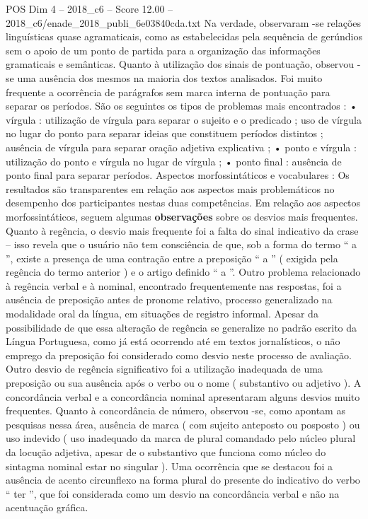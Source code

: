 \begin{textsample}{POS Dim 4 – 2018\_c6 – Score 12.00 – 2018\_c6/enade\_2018\_publi\_6e03840cda.txt}
Na verdade, observaram -se relações linguísticas quase agramaticais, como as estabelecidas pela sequência de gerúndios sem o apoio de um ponto de partida para a organização das informações gramaticais e semânticas.
Quanto à utilização dos sinais de pontuação, observou -se uma ausência dos mesmos na maioria dos textos analisados.
Foi muito frequente a ocorrência de parágrafos sem marca interna de pontuação para separar os períodos.
São os seguintes os tipos de problemas mais encontrados : • vírgula : utilização de vírgula para separar o sujeito e o predicado ; uso de vírgula no lugar do ponto para separar ideias que constituem períodos distintos ; ausência de vírgula para separar oração adjetiva explicativa ; • ponto e vírgula : utilização do ponto e vírgula no lugar de vírgula ; • ponto final : ausência de ponto final para separar períodos.
Aspectos morfossintáticos e vocabulares : Os resultados são transparentes em relação aos aspectos mais problemáticos no desempenho dos participantes nestas duas competências.
Em relação aos aspectos morfossintáticos, seguem algumas \textbf{observações} sobre os desvios mais frequentes.
Quanto à regência, o desvio mais frequente foi a falta do sinal indicativo da crase – isso revela que o usuário não tem consciência de que, sob a forma do termo “ a ”, existe a presença de uma contração entre a preposição “ a ” ( exigida pela regência do termo anterior ) e o artigo definido “ a ”.
Outro problema relacionado à regência verbal e à nominal, encontrado frequentemente nas respostas, foi a ausência de preposição antes de pronome relativo, processo generalizado na modalidade oral da língua, em situações de registro informal.
Apesar da possibilidade de que essa alteração de regência se generalize no padrão escrito da Língua Portuguesa, como já está ocorrendo até em textos jornalísticos, o não emprego da preposição foi considerado como desvio neste processo de avaliação.
Outro desvio de regência significativo foi a utilização inadequada de uma preposição ou sua ausência após o verbo ou o nome ( substantivo ou adjetivo ).
A concordância verbal e a concordância nominal apresentaram alguns desvios muito frequentes.
Quanto à concordância de número, observou -se, como apontam as pesquisas nessa área, ausência de marca ( com sujeito anteposto ou posposto ) ou uso indevido ( uso inadequado da marca de plural comandado pelo núcleo plural da locução adjetiva, apesar de o substantivo que funciona como núcleo do sintagma nominal estar no singular ).
Uma ocorrência que se destacou foi a ausência de acento circunflexo na forma plural do presente do indicativo do verbo “ ter ”, que foi considerada como um desvio na concordância verbal e não na acentuação gráfica.

\end{textsample}
